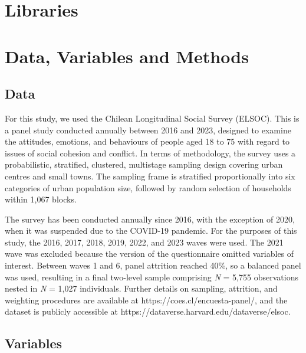 \documentclass[
  12pt,
]{article}
\begin{document}
\section{Libraries}\label{libraries}

\section{Data, Variables and Methods}\label{data-variables-and-methods}

\subsection{Data}\label{data}

For this study, we used the Chilean Longitudinal Social Survey (ELSOC).
This is a panel study conducted annually between 2016 and 2023, designed
to examine the attitudes, emotions, and behaviours of people aged 18 to
75 with regard to issues of social cohesion and conflict. In terms of
methodology, the survey uses a probabilistic, stratified, clustered,
multistage sampling design covering urban centres and small towns. The
sampling frame is stratified proportionally into six categories of urban
population size, followed by random selection of households within 1,067
blocks.

The survey has been conducted annually since 2016, with the exception of
2020, when it was suspended due to the COVID-19 pandemic. For the
purposes of this study, the 2016, 2017, 2018, 2019, 2022, and 2023 waves
were used. The 2021 wave was excluded because the version of the
questionnaire omitted variables of interest. Between waves 1 and 6,
panel attrition reached 40\%, so a balanced panel was used, resulting in
a final two-level sample comprising \emph{N} = 5,755 observations nested
in \emph{N} = 1,027 individuals. Further details on sampling, attrition,
and weighting procedures are available at
https://coes.cl/encuesta-panel/, and the dataset is publicly accessible
at https://dataverse.harvard.edu/dataverse/elsoc.

\subsection{Variables}\label{variables}
\end{document}
